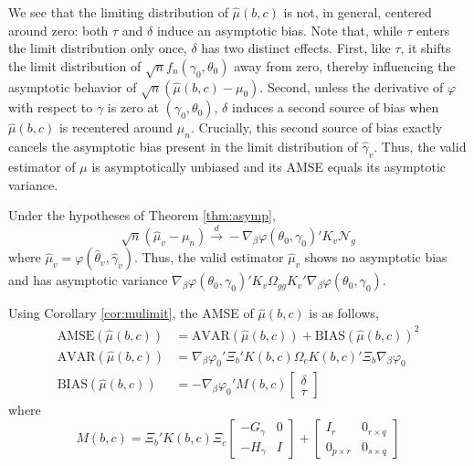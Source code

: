 We see that the limiting distribution of $\widehat{\mu}(b,c)$ is not, in general, centered around zero: both $\tau$ and $\delta$ induce an asymptotic bias. 
Note that, while $\tau$ enters the limit distribution only once, $\delta$ has two distinct effects. 
First, like $\tau$, it shifts the limit distribution of $\sqrt{n}f_n(\gamma_0, \theta_0)$ away from zero, thereby influencing the asymptotic behavior of $\sqrt{n}\left(\widehat{\mu}(b,c) - \mu_0 \right)$. 
Second, unless the derivative of $\varphi$ with respect to $\gamma$ is zero at $(\gamma_0, \theta_0)$, $\delta$ induces a second source of bias when $\widehat{\mu}(b,c)$ is recentered around $\mu_n$. 
Crucially, this second source of bias exactly cancels the asymptotic bias present in the limit distribution of $\widehat{\gamma}_v$. 
Thus, the valid estimator of $\mu$ is asymptotically unbiased and its AMSE equals its asymptotic variance.
\begin{cor}
\label{cor:muvalid}
Under the hypotheses of Theorem \ref{thm:asymp},
	$$\sqrt{n}\left( \widehat{\mu}_v - \mu_n\right) \overset{d}{\rightarrow} -\nabla_\beta \varphi(\theta_0, \gamma_0)' K_v\mathscr{N}_g$$
where $\widehat{\mu}_v = \varphi(\widehat{\theta}_v,\widehat{\gamma}_v)$. Thus, the valid estimator $\widehat{\mu}_v$ shows no asymptotic bias and has asymptotic variance $\nabla_\beta \varphi(\theta_0, \gamma_0)'K_v \Omega_{gg}K_v'\nabla_\beta \varphi(\theta_0, \gamma_0)$.
\end{cor}
 
Using Corollary \ref{cor:mulimit}, the AMSE of $\widehat{\mu}(b,c)$ is as follows,
	\begin{align}
	\label{eq:AMSE}
		\mbox{AMSE}\left(\widehat{\mu}(b,c)\right) &= \mbox{AVAR}\left(\widehat{\mu}\left(b,c\right)\right)  + \mbox{BIAS}\left(\widehat{\mu}\left(b,c\right)\right)^2\\
		\mbox{AVAR}\left(\widehat{\mu}\left(b,c\right)\right) &= \nabla_\beta\varphi_0'\Xi_b '  K(b,c)\Omega_c K(b,c)'\Xi_b\nabla_\beta\varphi_0\\
		\mbox{BIAS}\left(\widehat{\mu}\left(b,c\right)\right) &= -\nabla_{\beta} \varphi_0' M(b,c)\left[\begin{array}{c} \delta \\ \tau\end{array} \right]
		\label{eq:bias}
\end{align}
where
\begin{equation}
	M(b,c) = \Xi_b'K(b,c) \Xi_c \left[\begin{array}{cc} -G_\gamma & 0 \\ -H_\gamma & I \end{array} \right] +\left[\begin{array}{ll} I_r & 0_{r\times q} \\ 0_{p\times r} & 0_{s\times q} \end{array} \right]
\end{equation}

